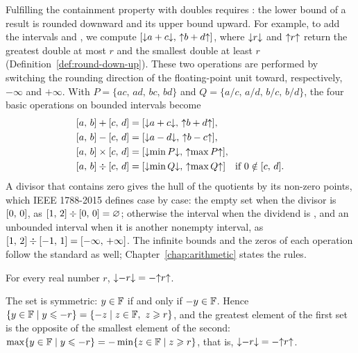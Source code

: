 Fulfilling the containment property with doubles requires : the lower bound of a result is rounded downward and its upper
bound upward. For example, to add the intervals  and ,
we compute $[\mathopen{\downarrow}a+c\mathclose{\downarrow},\,\mathopen{\uparrow}b+d\mathclose{\uparrow}]$, where $\mathopen{\downarrow}r\mathclose{\downarrow}$ and
$\mathopen{\uparrow}r\mathclose{\uparrow}$ return the greatest double at most $r$ and the smallest double
at least $r$ (Definition~\ref{def:round-down-up}). These two operations are
performed by switching the rounding direction of the floating-point unit
toward, respectively, $-\infty$ and $+\infty$. With
$P=\{ac,\,ad,\,bc,\,bd\}$ and $Q=\{a/c,\,a/d,\,b/c,\,b/d\}$, the four basic
operations on bounded intervals become
\begin{align*}
  \itv{a}{b}+\itv{c}{d} &= \itv{\roundDn{a+c}}{\roundUp{b+d}},\\
  \itv{a}{b}-\itv{c}{d} &= \itv{\roundDn{a-d}}{\roundUp{b-c}},\\
  \itv{a}{b}\times\itv{c}{d} &= \itv{\roundDn{\min P}}{\roundUp{\max P}},\\
  \itv{a}{b}\div\itv{c}{d} &= \itv{\roundDn{\min Q}}{\roundUp{\max Q}}
    \quad\text{if } 0\notin\itv{c}{d}.
\end{align*}
A divisor that contains zero gives the hull of the quotients by its
non-zero points, which IEEE 1788-2015 defines case by case: the empty set when
the divisor is $[0,\,0]$, as $[1,\,2]\div[0,\,0]=\varnothing$; otherwise the
interval  when the dividend is , and an unbounded interval
when it is another nonempty interval, as
$[1,\,2]\div[-1,\,1]=[-\infty,\,+\infty]$. The infinite bounds and the zeros of
each operation follow the standard as well; Chapter~\ref{chap:arithmetic}
states the rules.

\begin{Prop}\label{prop:round-neg}
For every real number $r$, $\mathopen{\downarrow}-r\mathclose{\downarrow}=-\mathopen{\uparrow}r\mathclose{\uparrow}$.
\end{Prop}
\demo The set \FSet{} is symmetric: $y\in\mathbb{F}$ if and only if
$-y\in\mathbb{F}$. Hence $\{y\in\FSet\mid y\leq-r\}=\{-z\mid z\in\FSet,\ z\geq
r\}$, and the greatest element of the first set is the opposite of the
smallest element of the second:
$\max\{y\in\mathbb{F}\mid y\leqslant-r\}=-\min\{z\in\mathbb{F}\mid z\geqslant r\}$, that is,
$\mathopen{\downarrow}-r\mathclose{\downarrow}=-\mathopen{\uparrow}r\mathclose{\uparrow}$.\boite


